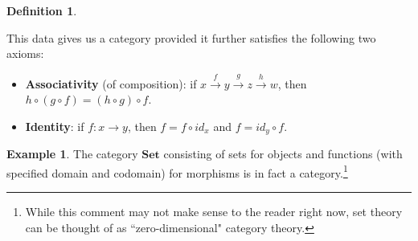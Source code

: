 \documentclass[11pt]{book}
\theoremstyle{definition}
\newtheorem{example}{Example}[section]
\theoremstyle{definition}
\newtheorem{definition}{Definition}[section]
\theoremstyle{definition}
\theoremstyle{theorem}
\theoremstyle{definition}
\begin{document}
\begin{definition}
\begin{itemize}
	\end{itemize}
	This data gives us a category provided it further satisfies the following two axioms:  
	\begin{itemize}
		\item \textbf{Associativity} (of composition): if $x \xrightarrow{f} y \xrightarrow{g} z \xrightarrow{h} w$, then $h \circ (g \circ f) = (h \circ g) \circ f$. 
		\begin{center}
		\end{center}
		\item \textbf{Identity}: if $f: x \rightarrow y$, then $f = f \circ id_x$ and $f = id_y \circ f$. 
	\end{itemize} 
\end{definition} 
\begin{example}
	The category $\textbf{Set}$ consisting of sets for objects and functions (with specified domain and codomain) for morphisms is in fact a category.\footnote{While this comment may not make sense to the reader right now, set theory can be thought of as ``zero-dimensional" category theory.}    
\end{example}
\end{document}
